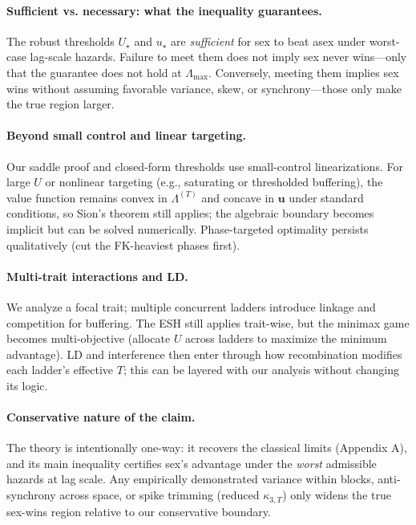 \documentclass[11pt]{article}
\theoremstyle{upright}
\newcommand{\horizon}{\Lambda}
\newcommand{\Lmax}{\horizon^{(T)}_{\max}}
\newcommand{\hazT}[1]{\Lambda^{(#1)}}          %
\renewcommand{\Lmax}{\Lambda_{\max}}
\begin{document}
\paragraph{Sufficient vs. necessary: what the inequality guarantees.}
The robust thresholds $U_\star$ and $u_\star$ are \emph{sufficient} for sex to beat asex under worst-case lag-scale hazards. Failure to meet them does not imply sex never wins—only that the guarantee does not hold at $\Lmax$. Conversely, meeting them implies sex wins without assuming favorable variance, skew, or synchrony—those only make the true region larger.

\paragraph{Beyond small control and linear targeting.}
Our saddle proof and closed-form thresholds use small-control linearizations. For large $U$ or nonlinear targeting (e.g., saturating or thresholded buffering), the value function remains convex in $\hazT{T}$ and concave in $\mathbf u$ under standard conditions, so Sion’s theorem still applies; the algebraic boundary becomes implicit but can be solved numerically. Phase-targeted optimality persists qualitatively (cut the FK-heaviest phases first).

\paragraph{Multi-trait interactions and LD.}
We analyze a focal trait; multiple concurrent ladders introduce linkage and competition for buffering. The ESH still applies trait-wise, but the minimax game becomes multi-objective (allocate $U$ across ladders to maximize the minimum advantage). LD and interference then enter through how recombination modifies each ladder’s effective $T$; this can be layered with our analysis without changing its logic.

\paragraph{Conservative nature of the claim.}
The theory is intentionally one-way: it recovers the classical limits (Appendix A), and its main inequality certifies sex’s advantage under the \emph{worst} admissible hazards at lag scale. Any empirically demonstrated variance within blocks, anti-synchrony across space, or spike trimming (reduced $\kappa_{3,T}$) only widens the true sex-wins region relative to our conservative boundary.
\end{document}
